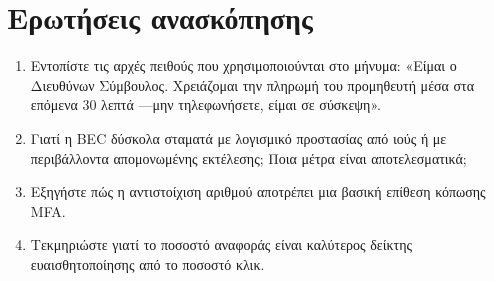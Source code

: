 \section*{Ερωτήσεις ανασκόπησης}
\begin{enumerate}
  \item Εντοπίστε τις αρχές πειθούς που χρησιμοποιούνται στο μήνυμα: «Είμαι ο Διευθύνων Σύμβουλος. Χρειάζομαι την πληρωμή του προμηθευτή μέσα στα επόμενα 30 λεπτά —μην τηλεφωνήσετε, είμαι σε σύσκεψη».
  \item Γιατί η BEC δύσκολα σταματά με λογισμικό προστασίας από ιούς ή με περιβάλλοντα απομονωμένης εκτέλεσης; Ποια μέτρα είναι αποτελεσματικά;
  \item Εξηγήστε πώς η αντιστοίχιση αριθμού αποτρέπει μια βασική επίθεση κόπωσης MFA.
  \item Τεκμηριώστε γιατί το ποσοστό αναφοράς είναι καλύτερος δείκτης ευαισθητοποίησης από το ποσοστό κλικ.
\end{enumerate}
